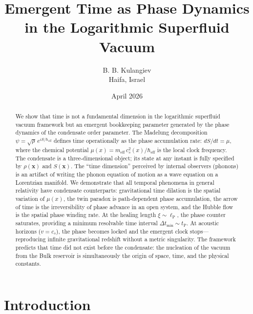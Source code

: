 \documentclass[12pt, a4paper]{article}
\newcommand{\meff}{m_{\mathrm{eff}}}
\newcommand{\heff}{\hbar_{\mathrm{eff}}}
\newcommand{\lP}{\ell_{\mathrm{P}}}
\newcommand{\tP}{t_{\mathrm{P}}}
\begin{document}
\title{Emergent Time as Phase Dynamics\\
in the Logarithmic Superfluid Vacuum}

\author{B. B. Kulangiev\\\small{Haifa, Israel}}
\date{April 2026}
\maketitle

\begin{abstract}
\noindent
We show that time is not a fundamental dimension
in the logarithmic superfluid vacuum framework but
an emergent bookkeeping parameter generated by the
phase dynamics of the condensate order parameter.
The Madelung decomposition $\psi = \sqrt{\rho}\,
e^{iS/\heff}$ defines time operationally as the
phase accumulation rate: $dS/dt = \mu$, where the
chemical potential $\mu(x) = \meff\,c_s^2(x)/\heff$
is the local clock frequency. The condensate is a
three-dimensional object; its state at any instant
is fully specified by $\rho(\mathbf{x})$ and
$S(\mathbf{x})$. The ``time dimension'' perceived
by internal observers (phonons) is an artifact of
writing the phonon equation of motion as a wave
equation on a Lorentzian manifold. We demonstrate
that all temporal phenomena in general relativity
have condensate counterparts: gravitational time
dilation is the spatial variation of $\mu(x)$, the
twin paradox is path-dependent phase accumulation,
the arrow of time is the irreversibility of phase
advance in an open system, and the Hubble flow is
the spatial phase winding rate. At the healing
length $\xi \sim \lP$, the phase counter saturates,
providing a minimum resolvable time interval
$\Delta t_{\min} \sim \tP$. At acoustic horizons
($v = c_s$), the phase becomes locked and the
emergent clock stops---reproducing infinite
gravitational redshift without a metric singularity.
The framework predicts that time did not exist
before the condensate: the nucleation of the vacuum
from the Bulk reservoir is simultaneously the origin
of space, time, and the physical constants.
\end{abstract}


\section{Introduction}
\label{sec:intro}
\end{document}
